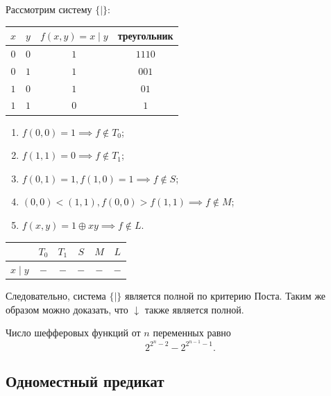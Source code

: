 \begin{example}
    Рассмотрим систему \(\{\mid\}\):
    {
    \renewcommand*{\arraystretch}{1.5}
    \begin{longtable}{|c|c|c|c|}
        \hline
        \(x\) & \(y\) & \(f(x, y) = x \mid y\) & треугольник \\
        \hline
        \(0\) & \(0\) & \(1\)                  & \(1110\)    \\
        \hline
        \(0\) & \(1\) & \(1\)                  & \(001\)     \\
        \hline
        \(1\) & \(0\) & \(1\)                  & \(01\)      \\
        \hline
        \(1\) & \(1\) & \(0\)                  & \(1\)       \\
        \hline
    \end{longtable}
    }

    \begin{enumerate}
        \item \(f(0, 0) = 1 \implies f \notin T_0\);
        \item \(f(1, 1) = 0 \implies f \notin T_1\);
        \item \(f(0, 1) = 1, f(1, 0) = 1 \implies f \notin S\);
        \item \((0, 0) < (1, 1), f(0, 0) > f(1, 1) \implies f \notin M\);
        \item \(f(x, y) = 1 \oplus xy \implies f \notin L\).
    \end{enumerate}

    {
    \renewcommand*{\arraystretch}{1.5}
    \begin{longtable}{|c|c|c|c|c|c|}
        \hline
                     & \(T_0\) & \(T_1\) & \(S\) & \(M\) & \(L\) \\
        \hline
        \(x \mid y\) & \(-\)   & \(-\)   & \(-\) & \(-\) & \(-\) \\
        \hline
    \end{longtable}
    }

    Следовательно, система \(\{|\}\) является полной по критерию Поста. Таким же образом можно доказать, что \({\downarrow}\) также является полной.
\end{example}

\begin{note*}
    Число шефферовых функций от \(n\) переменных равно
    \[
        2^{2^n - 2} - 2^{2^{n - 1} - 1}.
    \]
\end{note*}

\subsection{Одноместный предикат}

